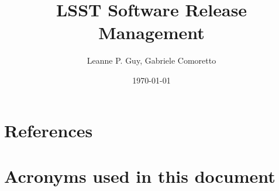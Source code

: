 \documentclass[DM,lsstdraft,toc]{lsstdoc}
\title{LSST Software Release Management}
\author{%
Leanne P. Guy, Gabriele Comoretto
}
\date{\today}
\begin{document}
\maketitle



\newpage


\newpage


\appendix



\section{References} \label{sec:bib}


\section{Acronyms used in this document}\label{sec:acronyms}

\end{document}
